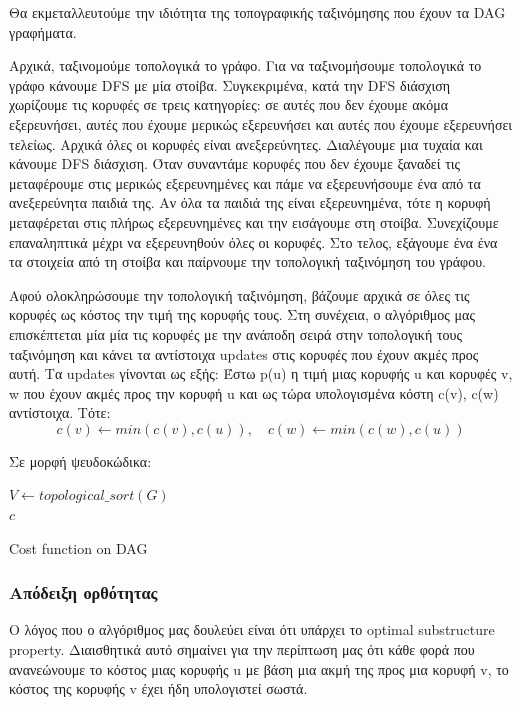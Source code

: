 \documentclass[a4paper,oneside, 11pt]{article}
\begin{document}
Θα εκμεταλλευτούμε την ιδιότητα της τοπογραφικής ταξινόμησης που έχουν τα DAG γραφήματα. \bigbreak 

Αρχικά, ταξινομούμε τοπολογικά το γράφο. Για να ταξινομήσουμε τοπολογικά το γράφο κάνουμε DFS με μία στοίβα. Συγκεκριμένα, κατά την DFS διάσχιση χωρίζουμε τις κορυφές σε τρεις κατηγορίες: σε αυτές που δεν έχουμε ακόμα εξερευνήσει, αυτές που έχουμε μερικώς εξερευνήσει και αυτές που έχουμε εξερευνήσει τελείως. Αρχικά όλες οι κορυφές είναι ανεξερεύνητες. Διαλέγουμε μια τυχαία και κάνουμε DFS διάσχιση. Όταν συναντάμε κορυφές που δεν έχουμε ξαναδεί τις μεταφέρουμε στις μερικώς εξερευνημένες και πάμε να εξερευνήσουμε ένα από τα ανεξερεύνητα παιδιά της. Αν όλα τα παιδιά της είναι εξερευνημένα, τότε η κορυφή μεταφέρεται στις πλήρως εξερευνημένες και την εισάγουμε στη στοίβα. Συνεχίζουμε επαναληπτικά μέχρι να εξερευνηθούν όλες οι κορυφές. Στο τελος, εξάγουμε ένα ένα τα στοιχεία από τη στοίβα και παίρνουμε την τοπολογική ταξινόμηση του γράφου.  \bigbreak 

Αφού ολοκληρώσουμε την τοπολογική ταξινόμηση, βάζουμε αρχικά σε όλες τις κορυφές ως κόστος την τιμή της κορυφής τους. Στη συνέχεια,  ο αλγόριθμος μας επισκέπτεται μία μία τις κορυφές με την ανάποδη σειρά στην τοπολογική τους ταξινόμηση και κάνει τα αντίστοιχα updates στις κορυφές που έχουν ακμές προς αυτή. Τα updates γίνονται ως εξής: Έστω p(u) η τιμή μιας κορυφής u και κορυφές v, w που έχουν ακμές προς την κορυφή u και ως τώρα υπολογισμένα κόστη c(v), c(w) αντίστοιχα. Τότε:
$$
c(v) \gets min\left(c(v), c(u)\right)  , \quad c(w) \gets min\left(c(w), c(u)\right)$$

Σε μορφή ψευδοκώδικα: \bigbreak 
{\centering
\begin{minipage}{.7\linewidth}
\begin{algorithm}[H]
	$V \gets topological\_sort(G)$ \\
	\Return $c$
	\bigbreak
	\caption{{Cost function on DAG}}
\end{algorithm}
\end{minipage}
\par
}


\subsubsection{Απόδειξη ορθότητας}

Ο λόγος που ο αλγόριθμος μας δουλεύει είναι ότι υπάρχει το optimal substructure property. Διαισθητικά αυτό σημαίνει για την περίπτωση μας ότι κάθε φορά που ανανεώνουμε το κόστος μιας κορυφής u με βάση μια ακμή της προς μια κορυφή v, το κόστος της κορυφής v έχει ήδη υπολογιστεί σωστά. \bigbreak 
\end{document}
